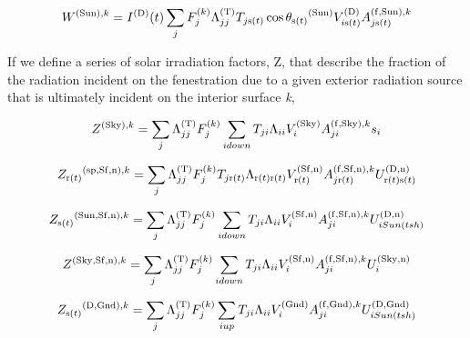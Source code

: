 \begin{equation}
{W^{{\rm{(Sun)}},k}} = {I^{{\rm{(D)}}}}(t)\sum\limits_j {F_j^{{\rm{(}}k{\rm{)}}}\Lambda_{jj}^{{\rm{(T)}}}{T_{j{\rm{ s}}(t)}}\cos {\theta_{{\rm{s(}}t{\rm{)}}}}^{{\rm{(Sun)}}}V_{i{\rm{ s(}}t{\rm{)}}}^{{\rm{(D)}}}A_{j{\rm{ s(}}t{\rm{)}}}^{{\rm{(f, Sun), }}k}}
\end{equation}

If we define a series of solar irradiation factors, Z, that describe the fraction of the radiation incident on the fenestration due to a given exterior radiation source that is ultimately incident on the interior surface \emph{k},

\begin{equation}
{Z^{{\rm{(Sky), }}k}} = \sum\limits_j {\Lambda_{jj}^{{\rm{(T)}}}F_j^{{\rm{(}}k{\rm{)}}}\sum\limits_{i{\rm{ }}down} {{T_{ji}}{\Lambda_{ii}}V_i^{{\rm{(Sky)}}}A_{ji}^{{\rm{(f, Sky), }}k}{s_i}} }
\end{equation}

\begin{equation}
{Z_{{\rm{r(}}t{\rm{)}}}}^{{\rm{(sp, Sf, n)}},k} = \sum\limits_j {\Lambda_{jj}^{{\rm{(T)}}}F_j^{{\rm{(}}k{\rm{)}}}{T_{j{\rm{ r(}}t{\rm{)}}}}{\Lambda_{{\rm{ r(}}t{\rm{) r(}}t{\rm{)}}}}V_{{\rm{ r(}}t{\rm{)}}}^{{\rm{(Sf, n)}}}A_{j{\rm{ r(}}t{\rm{)}}}^{{\rm{(f, Sf, n), }}k}U_{{\rm{ r(}}t{\rm{) s(}}t{\rm{)}}}^{{\rm{(D,n)}}}}
\end{equation}

\begin{equation}
{Z_{{\rm{s(}}t{\rm{)}}}}^{{\rm{(Sun, Sf, n)}},k} = \sum\limits_j {\Lambda_{jj}^{{\rm{(T)}}}F_j^{{\rm{(}}k{\rm{)}}}\sum\limits_{i{\rm{ }}down} {{T_{ji}}{\Lambda_{ii}}V_i^{{\rm{(Sf, n)}}}A_{ji}^{{\rm{(f, Sf, n), }}k}U_{i{\rm{ }}Sun(tsh)}^{{\rm{(D,n)}}}} }
\end{equation}

\begin{equation}
{Z^{{\rm{(Sky, Sf, n)}},k}} = \sum\limits_j {\Lambda_{jj}^{{\rm{(T)}}}F_j^{{\rm{(}}k{\rm{)}}}\sum\limits_{i{\rm{ }}down} {{T_{ji}}{\Lambda_{ii}}V_i^{{\rm{(Sf, n)}}}A_{ji}^{{\rm{(f, Sf, n), }}k}U_i^{{\rm{(Sky, n)}}}} }
\end{equation}

\begin{equation}
{Z_{{\rm{s(}}t{\rm{)}}}}^{{\rm{(D, Gnd)}},k} = \sum\limits_j {\Lambda_{jj}^{{\rm{(T)}}}F_j^{{\rm{(}}k{\rm{)}}}\sum\limits_{i{\rm{ }}up} {{T_{ji}}{\Lambda_{ii}}V_i^{{\rm{(Gnd)}}}A_{ji}^{{\rm{(f, Gnd), }}k}U_{i{\rm{ }}Sun(tsh)}^{{\rm{(D, Gnd)}}}} }
\end{equation}

